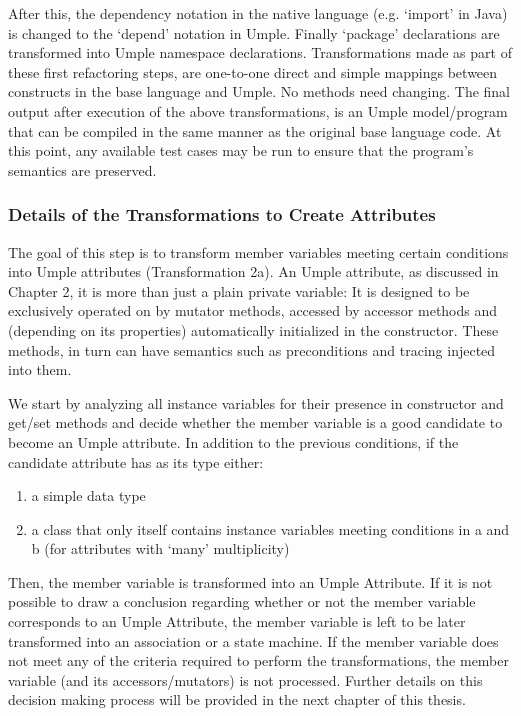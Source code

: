 After this, the dependency notation in the native language (e.g. `import' in Java) is changed to the `depend' notation in Umple. Finally `package' declarations are transformed into Umple namespace declarations. 
Transformations made as part of these first refactoring steps, are one-to-one direct and simple mappings between constructs in the base language and Umple. No methods need changing. The final output after execution of the above transformations, is an Umple model/program that can be compiled in the same manner as the original base language code. At this point, any available test cases may be run to ensure that the program's semantics are preserved.

\subsubsection{Details of the Transformations to Create Attributes}

The goal of this step is to transform member variables meeting certain conditions into Umple attributes (Transformation 2a). An Umple attribute, as discussed in Chapter 2, it is more than just a plain private variable: It is designed to be exclusively operated on by mutator methods, accessed by accessor methods and (depending on its properties) automatically initialized in the constructor. These methods, in turn can have semantics such as preconditions and tracing injected into them. 

We start by analyzing all instance variables for their presence in constructor and get/set methods and decide whether the member variable is a good candidate to become an Umple attribute. In addition to the previous conditions, if the candidate attribute has as its type either:

\begin{enumerate}
\item a simple data type
\item a class that only itself contains instance variables meeting conditions in a and b (for attributes with `many' multiplicity)
\end{enumerate}

Then, the member variable is transformed into an Umple Attribute. If it is not possible to draw a conclusion regarding whether or not the member variable corresponds to an Umple Attribute, the member variable is left to be later transformed into an association or a state machine. If the member variable does not meet any of the criteria required to perform the transformations, the member variable (and its accessors/mutators) is not processed. Further details on this decision making process will be provided in the next chapter of this thesis. 

